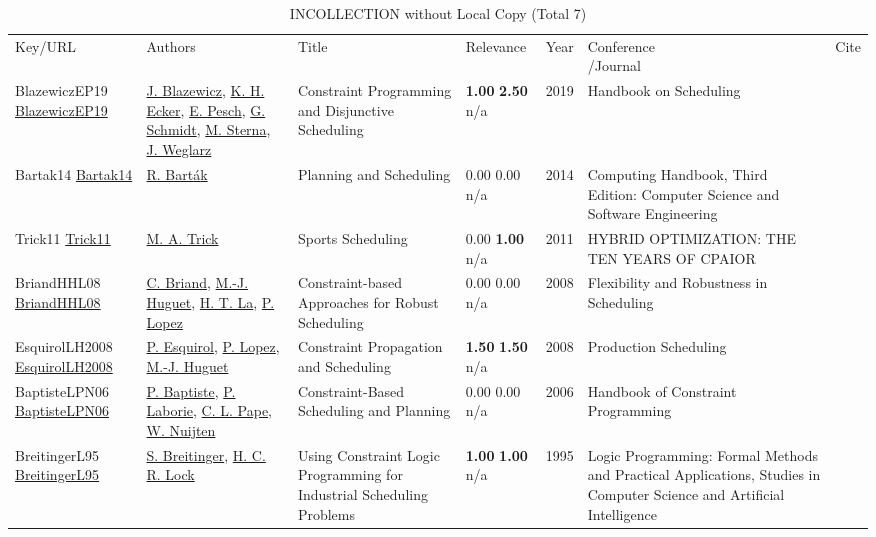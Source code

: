 {\scriptsize
\begin{longtable}{p{3cm}p{5cm}p{10cm}p{1cm}rp{2.5cm}l}
\rowcolor{white}\caption{INCOLLECTION without Local Copy (Total 7)}\\ \toprule
\rowcolor{white}Key/URL & Authors & Title & Relevance &Year & \shortstack{Conference\\/Journal} & Cite\\ \midrule
\endhead
\bottomrule
\endfoot
BlazewiczEP19 \href{https://ideas.repec.org/h/spr/ihichp/978-3-319-99849-7_16.html}{BlazewiczEP19} & \hyperref[auth:a765]{J. Blazewicz}, \hyperref[auth:a766]{K. H. Ecker}, \hyperref[auth:a438]{E. Pesch}, \hyperref[auth:a767]{G. Schmidt}, \hyperref[auth:a768]{M. Sterna}, \hyperref[auth:a769]{J. Weglarz} & {Constraint Programming and Disjunctive Scheduling} & \noindent{}\textbf{1.00} \textbf{2.50} n/a & 2019 & {Handbook on Scheduling} & \cite{BlazewiczEP19}\\
Bartak14 \href{}{Bartak14} & \hyperref[auth:a152]{R. Bart{\'{a}}k} & Planning and Scheduling & \noindent{}\textcolor{black!50}{0.00} \textcolor{black!50}{0.00} n/a & 2014 & Computing Handbook, Third Edition: Computer Science and Software Engineering & \cite{Bartak14}\\
Trick11 \href{http://dx.doi.org/10.1007/978-1-4419-1644-0_15}{Trick11} & \hyperref[auth:a1389]{M. A. Trick} & Sports Scheduling & \noindent{}\textcolor{black!50}{0.00} \textbf{1.00} n/a & 2011 & HYBRID OPTIMIZATION: THE TEN YEARS OF CPAIOR & \cite{Trick11}\\
BriandHHL08 \href{http://dx.doi.org/10.1002/9780470611432.ch9}{BriandHHL08} & \hyperref[auth:a1198]{C. Briand}, \hyperref[auth:a1199]{M.-J. Huguet}, \hyperref[auth:a1200]{H. T. La}, \hyperref[auth:a3]{P. Lopez} & Constraint-based Approaches for Robust Scheduling & \noindent{}\textcolor{black!50}{0.00} \textcolor{black!50}{0.00} n/a & 2008 & Flexibility and Robustness in Scheduling & \cite{BriandHHL08}\\
EsquirolLH2008 \href{http://dx.doi.org/10.1002/9780470611050.ch5}{EsquirolLH2008} & \hyperref[auth:a1248]{P. Esquirol}, \hyperref[auth:a3]{P. Lopez}, \hyperref[auth:a1199]{M.-J. Huguet} & Constraint Propagation and Scheduling & \noindent{}\textbf{1.50} \textbf{1.50} n/a & 2008 & Production Scheduling & \cite{EsquirolLH2008}\\
BaptisteLPN06 \href{https://doi.org/10.1016/S1574-6526(06)80026-X}{BaptisteLPN06} & \hyperref[auth:a162]{P. Baptiste}, \hyperref[auth:a118]{P. Laborie}, \hyperref[auth:a163]{C. L. Pape}, \hyperref[auth:a656]{W. Nuijten} & Constraint-Based Scheduling and Planning & \noindent{}\textcolor{black!50}{0.00} \textcolor{black!50}{0.00} n/a & 2006 & Handbook of Constraint Programming & \cite{BaptisteLPN06}\\
BreitingerL95 \href{}{BreitingerL95} & \hyperref[auth:a695]{S. Breitinger}, \hyperref[auth:a696]{H. C. R. Lock} & Using Constraint Logic Programming for Industrial Scheduling Problems & \noindent{}\textbf{1.00} \textbf{1.00} n/a & 1995 & Logic Programming: Formal Methods and Practical Applications, Studies in Computer Science and Artificial Intelligence & \cite{BreitingerL95}\\
\end{longtable}
}

